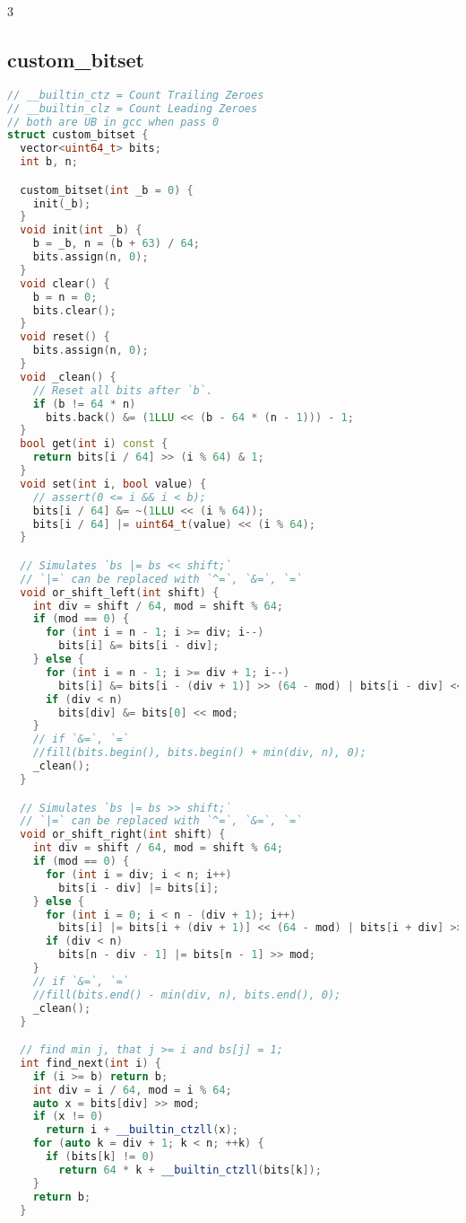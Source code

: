 \documentclass[9pt,a4paper,landscape,twosided]{extarticle}
\begin{document}
\begin{multicols*}{3}
\subsection{custom\_bitset}
\begin{lstlisting}[language=C++]
// __builtin_ctz = Count Trailing Zeroes
// __builtin_clz = Count Leading Zeroes
// both are UB in gcc when pass 0
struct custom_bitset {
  vector<uint64_t> bits;
  int b, n;

  custom_bitset(int _b = 0) {
    init(_b);
  }
  void init(int _b) {
    b = _b, n = (b + 63) / 64;
    bits.assign(n, 0);
  }
  void clear() {
    b = n = 0;
    bits.clear();
  }
  void reset() {
    bits.assign(n, 0);
  }
  void _clean() {
    // Reset all bits after `b`.
    if (b != 64 * n)
      bits.back() &= (1LLU << (b - 64 * (n - 1))) - 1;
  }
  bool get(int i) const {
    return bits[i / 64] >> (i % 64) & 1;
  }
  void set(int i, bool value) {
    // assert(0 <= i && i < b);
    bits[i / 64] &= ~(1LLU << (i % 64));
    bits[i / 64] |= uint64_t(value) << (i % 64);
  }

  // Simulates `bs |= bs << shift;`
  // `|=` can be replaced with `^=`, `&=`, `=`
  void or_shift_left(int shift) {
    int div = shift / 64, mod = shift % 64;
    if (mod == 0) {
      for (int i = n - 1; i >= div; i--)
        bits[i] &= bits[i - div];
    } else {
      for (int i = n - 1; i >= div + 1; i--)
        bits[i] &= bits[i - (div + 1)] >> (64 - mod) | bits[i - div] << mod;
      if (div < n)
        bits[div] &= bits[0] << mod;
    }
    // if `&=`, `=`
    //fill(bits.begin(), bits.begin() + min(div, n), 0);
    _clean();
  }

  // Simulates `bs |= bs >> shift;`
  // `|=` can be replaced with `^=`, `&=`, `=`
  void or_shift_right(int shift) {
    int div = shift / 64, mod = shift % 64;
    if (mod == 0) {
      for (int i = div; i < n; i++)
        bits[i - div] |= bits[i];
    } else {
      for (int i = 0; i < n - (div + 1); i++)
        bits[i] |= bits[i + (div + 1)] << (64 - mod) | bits[i + div] >> mod;
      if (div < n)
        bits[n - div - 1] |= bits[n - 1] >> mod;
    }
    // if `&=`, `=`
    //fill(bits.end() - min(div, n), bits.end(), 0);
    _clean();
  }

  // find min j, that j >= i and bs[j] = 1;
  int find_next(int i) {
    if (i >= b) return b;
    int div = i / 64, mod = i % 64;
    auto x = bits[div] >> mod;
    if (x != 0)
      return i + __builtin_ctzll(x);
    for (auto k = div + 1; k < n; ++k) {
      if (bits[k] != 0)
        return 64 * k + __builtin_ctzll(bits[k]);
    }
    return b;
  }


\end{lstlisting}
\end{multicols*}
\end{document}
